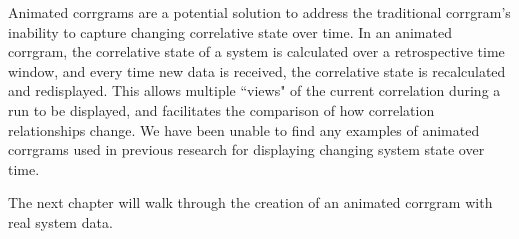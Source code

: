 Animated corrgrams are a potential solution to address the traditional corrgram's inability to capture changing correlative state over time. In an animated corrgram, the correlative state of a system is calculated over a retrospective time window, and every time new data is received, the correlative state is recalculated and redisplayed. This allows multiple ``views" of the current correlation during a run to be displayed, and facilitates the comparison of how correlation relationships change. We have been unable to find any examples of animated corrgrams used in previous research for displaying changing system state over time.

The next chapter will walk through the creation of an animated corrgram with real system data.